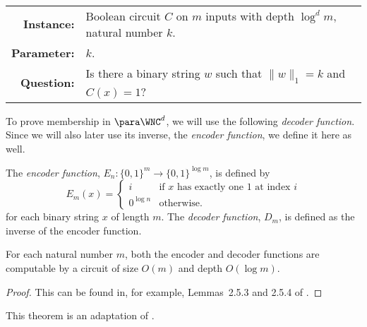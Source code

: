 \begin{definition}[$\pNCSAT$]
  \mbox{} \\
  \begin{tabular}{r p{9.2cm}}
    \textbf{Instance:} & Boolean circuit $C$ on $m$ inputs with depth $\log^d m$, natural number $k$. \\
    \textbf{Parameter:} & $k$. \\
    \textbf{Question:} & Is there a binary string $w$ such that $\|w\|_1 = k$ and $C(x) = 1$?
  \end{tabular}
\end{definition}

To prove membership in $\para \WNC^d$, we will use the following \emph{decoder function}.
Since we will also later use its inverse, the \emph{encoder function}, we define it here as well.

\begin{definition}\label{def:coding}
  The \emph{encoder function}, $E_n \colon \{0, 1\}^m \to \{0, 1\}^{\log m}$, is defined by
  \[
  E_m(x) =
  \begin{cases}
    i & \text{if } x \text{ has exactly one 1 at index } i \\
    0^{\log n} & \text{otherwise}.
  \end{cases}
  \]
  for each binary string $x$ of length $m$.
  The \emph{decoder function}, $D_m$, is defined as the inverse of the encoder function.
\end{definition}

\begin{lemma}\label{lem:codingbounds}
  For each natural number $m$, both the encoder and decoder functions are computable by a circuit of size $O(m)$ and depth $O(\log m)$.
\end{lemma}
\begin{proof}
  This can be found in, for example, Lemmas~2.5.3 and 2.5.4 of \autocite{savage98}.
\end{proof}

This theorem is an adaptation of \autocite[Lemma~3.3]{cc97lim}.

